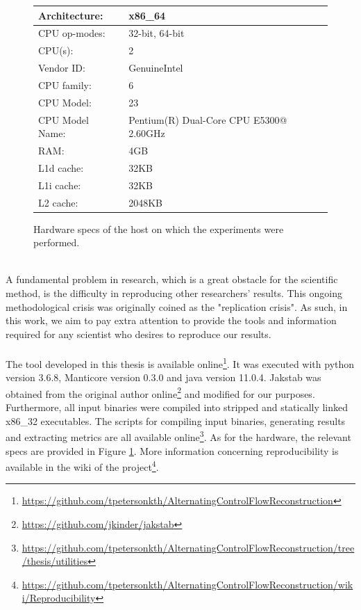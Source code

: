 \documentclass{kththesis}
\begin{document}
\begin{figure}[ht]
\begin{tabular}{|ll|}
\hline
Architecture:   & x86\_64                                 \\ \hline
CPU op-modes: & 32-bit, 64-bit                            \\ \hline
CPU(s):         & 2                                       \\ \hline
Vendor ID:      & GenuineIntel                            \\ \hline
CPU family:     & 6                                       \\ \hline
CPU Model:      & 23                                      \\ \hline
CPU Model Name: & Pentium(R) Dual-Core CPU E5300@ 2.60GHz \\ \hline
RAM:            & 4GB                                     \\ \hline%
L1d cache:      & 32KB                                    \\ \hline
L1i cache:      & 32KB                                    \\ \hline
L2 cache:       & 2048KB                                  \\ \hline
\end{tabular}
\caption{Hardware specs of the host on which the experiments were performed.}
\label{fig:HWspecs}
\end{figure}
\noindent
\\ 
A fundamental problem in research, which is a great obstacle for the scientific method, is the difficulty in reproducing other researchers' results. This ongoing methodological crisis was originally coined as the "replication crisis"\cite{replicability}. As such, in this work, we aim to pay extra attention to provide the tools and information required for any scientist who desires to reproduce our results. 
\\ \\
The tool developed in this thesis is available online\footnote{\url{https://github.com/tpetersonkth/AlternatingControlFlowReconstruction}}. It was executed with python version 3.6.8, Manticore version 0.3.0 and java version 11.0.4. Jakstab was obtained from the original author online\footnote{\url{https://github.com/jkinder/jakstab}} and modified for our purposes. Furthermore, all input binaries were compiled into stripped and statically linked x86\_32 executables. The scripts for compiling input binaries, generating results and extracting metrics are all available online\footnote{\url{https://github.com/tpetersonkth/AlternatingControlFlowReconstruction/tree/thesis/utilities}}. As for the hardware, the relevant specs are provided in Figure \ref{fig:HWspecs}. More information concerning reproducibility is available in the wiki of the project\footnote{\url{https://github.com/tpetersonkth/AlternatingControlFlowReconstruction/wiki/Reproducibility}}.
\end{document}
